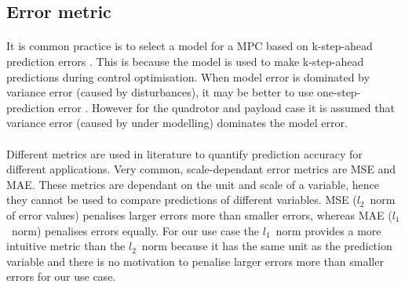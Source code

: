 
    \subsection{Error metric}

        \paragraph{}        
        It is common practice is to select a model for a MPC based on k-step-ahead prediction errors \cite{Zhao2014}.
        This is because the model is used to make k-step-ahead predictions during control optimisation.
        When model error is dominated by variance error (caused by disturbances), 
        it may be better to use one-step-prediction error \cite{Zhao2014}.
        However for the quadrotor and payload case it is assumed that variance error 
        (caused by under modelling) dominates the model error.

        \paragraph{}
        Different metrics are used in literature to quantify prediction accuracy for different applications.
        Very common, scale-dependant error metrics are MSE and MAE.
        These metrics are dependant on the unit and scale of a variable, 
        hence they cannot be used to compare predictions of different variables.
        MSE ($l_2$~norm of error values) penalises larger errors more than smaller errors, 
        whereas MAE ($l_1$~norm) penalises errors equally.
        For our use case the $l_1$~norm provides a more intuitive metric than the $l_2$~norm
        because it has the same unit as the prediction variable
        and there is no motivation to penalise larger errors more than smaller errors for our use case.

